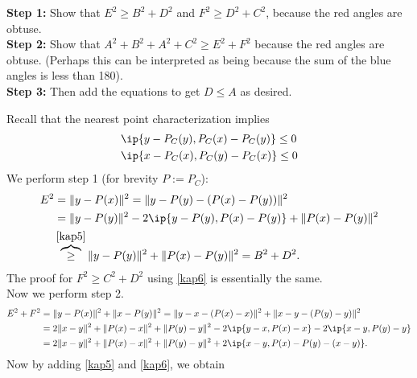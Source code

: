 \documentclass[../borwein-lewis_notes.tex]{subfiles}
\begin{document}
\begin{enumerate}[(a)]
\begin{enumerate}[(i)]
{\begin{minipage}{0.4\textwidth}
\end{minipage}
\begin{minipage}{0.5\textwidth}
\textbf{Step 1:} Show that $E^2 \geq B^2+D^2$ and $F^2\geq D^2+C^2$, because 
the red angles are obtuse. \\
\textbf{Step 2:} Show that $A^2+B^2+A^2+C^2\geq E^2+F^2$ because the red angles 
are obtuse. (Perhaps this can be interpreted as being because the sum 
of the blue angles is less than 180). \\
\textbf{Step 3:} Then add the equations to get $D\leq A$ as desired.
\end{minipage}
Recall that the nearest point characterization implies
\begin{align}
\label{kap5}
&\ip{y-P_C(y), P_C(x)-P_C(y)} \leq 0\\
\label{kap6}
&\ip{x-P_C(x), P_C(y)-P_C(x)} \leq 0
\end{align}
We perform step 1 (for brevity $P:=P_C$): 
\begin{align*}
E^2&=\|y-P(x)\|^2 = \|y-P(y) - (P(x)-P(y))\|^2 \\
&= \|y-P(y)\|^2 
-2\ip{y-P(y), P(x)-P(y)} + \|P(x)-P(y)\|^2 \\
&\overbrace{\geq}^{\eqref{kap5}}
 \|y-P(y)\|^2 + \|P(x)-P(y)\|^2 = B^2 + D^2.
\end{align*}
The proof for $F^2 \geq C^2 + D^2$ using \eqref{kap6} is essentially the 
same. \\
Now we perform step 2. 
\begin{align*}
E^2 + F^2 &= \|y-P(x)\|^2 + \|x-P(y)\|^2 = \|y-x-(P(x)-x)\|^2 
+ \|x-y-(P(y)-y)\|^2 \\
&= 2\|x-y\|^2 + \|P(x)-x\|^2 + \|P(y)-y\|^2 - 2\ip{y-x, P(x)-x}
-2\ip{x-y, P(y)-y} \\
&= 2\|x-y\|^2 + \|P(x)-x\|^2 + \|P(y)-y\|^2 + 2\ip{x-y, P(x)-P(y)-(x-y)}.
\end{align*}
Now by adding \eqref{kap5} and \eqref{kap6}, we obtain 
}
\end{enumerate}
\end{enumerate}
\end{document}
